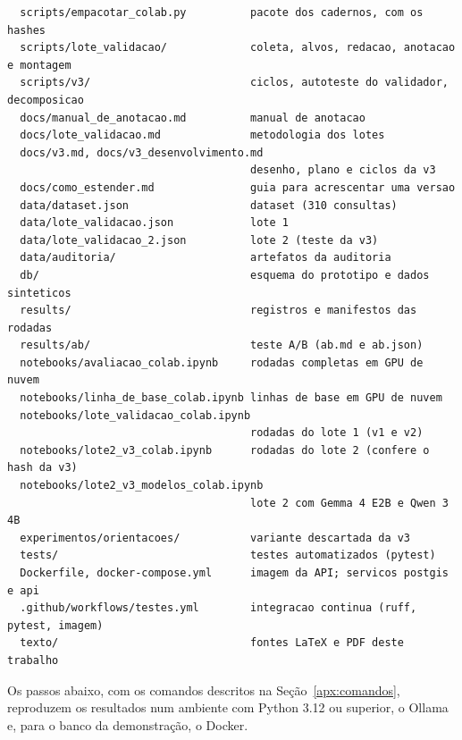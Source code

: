 {\begin{verbatim}
  scripts/empacotar_colab.py          pacote dos cadernos, com os hashes
  scripts/lote_validacao/             coleta, alvos, redacao, anotacao e montagem
  scripts/v3/                         ciclos, autoteste do validador, decomposicao
  docs/manual_de_anotacao.md          manual de anotacao
  docs/lote_validacao.md              metodologia dos lotes
  docs/v3.md, docs/v3_desenvolvimento.md
                                      desenho, plano e ciclos da v3
  docs/como_estender.md               guia para acrescentar uma versao
  data/dataset.json                   dataset (310 consultas)
  data/lote_validacao.json            lote 1
  data/lote_validacao_2.json          lote 2 (teste da v3)
  data/auditoria/                     artefatos da auditoria
  db/                                 esquema do prototipo e dados sinteticos
  results/                            registros e manifestos das rodadas
  results/ab/                         teste A/B (ab.md e ab.json)
  notebooks/avaliacao_colab.ipynb     rodadas completas em GPU de nuvem
  notebooks/linha_de_base_colab.ipynb linhas de base em GPU de nuvem
  notebooks/lote_validacao_colab.ipynb
                                      rodadas do lote 1 (v1 e v2)
  notebooks/lote2_v3_colab.ipynb      rodadas do lote 2 (confere o hash da v3)
  notebooks/lote2_v3_modelos_colab.ipynb
                                      lote 2 com Gemma 4 E2B e Qwen 3 4B
  experimentos/orientacoes/           variante descartada da v3
  tests/                              testes automatizados (pytest)
  Dockerfile, docker-compose.yml      imagem da API; servicos postgis e api
  .github/workflows/testes.yml        integracao continua (ruff, pytest, imagem)
  texto/                              fontes LaTeX e PDF deste trabalho
\end{verbatim}
}

Os passos abaixo, com os comandos descritos na Seção~\ref{apx:comandos}, reproduzem os resultados num ambiente com Python 3.12 ou superior, o Ollama e, para o banco da demonstração, o Docker.

